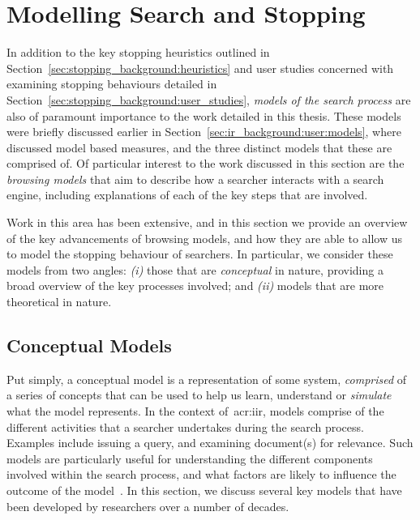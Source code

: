 \section{Modelling Search and Stopping}
In addition to the key stopping heuristics outlined in Section~\ref{sec:stopping_background:heuristics} and user studies concerned with examining stopping behaviours detailed in Section~\ref{sec:stopping_background:user_studies}, \emph{models of the search process} are also of paramount importance to the work detailed in this thesis. These models were briefly discussed earlier in Section~\ref{sec:ir_background:user:models}, where~\cite{carterette2011models} discussed model based measures, and the three distinct models that these are comprised of. Of particular interest to the work discussed in this section are the \emph{browsing models} that aim to describe how a searcher interacts with a search engine, including explanations of each of the key steps that are involved.

Work in this area has been extensive, and in this section we provide an overview of the key advancements of browsing models, and how they are able to allow us to model the stopping behaviour of searchers. In particular, we consider these models from two angles: \emph{(i)} those that are \emph{conceptual} in nature, providing a broad overview of the key processes involved; and \emph{(ii)} models that are more theoretical in nature.


\subsection{Conceptual Models}\label{sec:stopping_background:models:conceptual}
Put simply, a conceptual model is a representation of some system, \emph{comprised} of a series of concepts that can be used to help us learn, understand or \emph{simulate} what the model represents. In the context of~\gls{acr:iir}, models comprise of the different activities that a searcher undertakes during the search process. Examples include issuing a query, and examining document(s) for relevance. Such models are particularly useful for understanding the different components involved within the search process, and what factors are likely to influence the outcome of the model~\citep{azzopardi2015theories}. In this section, we discuss several key models that have been developed by researchers over a number of decades.

